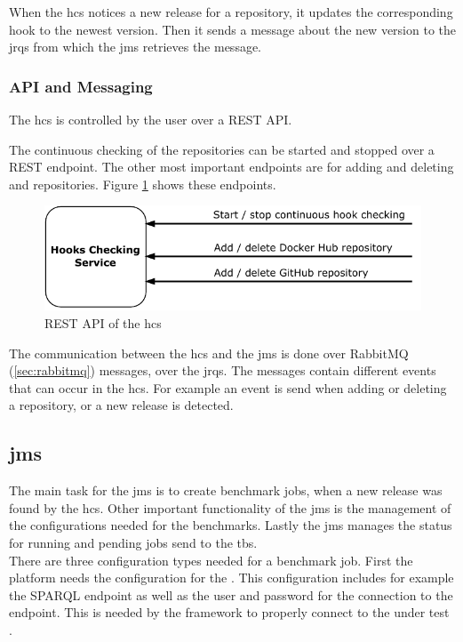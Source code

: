 When the \ac{hcs} notices a new release for a repository, it updates the corresponding hook to the newest version.
Then it sends a message about the new version to the \aclp{jrq} from which the \acl{jms} retrieves the message.

\subsubsection{API and Messaging}
\label{sec:hooks_api}
The \ac{hcs} is controlled by the user over a REST API.

The continuous checking of the repositories can be started and stopped over a REST endpoint.
The other most important endpoints are for adding and deleting \gh{} and \dockh{} repositories.
Figure \ref{fig:rest_apis_approach_hcs} shows these endpoints.
\begin{figure}[tbph]
	\centering
	\includegraphics[width=.57\textwidth]{figures/rest-apis-approach-hcs.pdf}
	\caption{REST API of the \acl{hcs}}
	\label{fig:rest_apis_approach_hcs}
\end{figure}

The communication between the \ac{hcs} and the \acl{jms} is done over RabbitMQ (\ref{sec:rabbitmq}) messages, over the \aclp{jrq}.
The messages contain different events that can occur in the \ac{hcs}.
For example an event is send when adding or deleting a repository, or a new release is detected.


\subsection{\acl{jms}}
\label{sec:jobs_managing_service}
The main task for the \acf{jms} is to create benchmark jobs, when a new release was found by the \ac{hcs}.
Other important functionality of the \ac{jms} is the management of the configurations needed for the benchmarks.
Lastly the \ac{jms} manages the status for running and pending jobs send to the \acl{tbs}.
\\

There are three configuration types needed for a benchmark job.
First the platform needs the configuration for the \ts{}.
This configuration includes for example the SPARQL endpoint as well as the user and password for the connection to the endpoint.
This is needed by the \iguana{} framework to properly connect to the \ts{} under test \cite{IguanaDocumentationConfiguration}.

